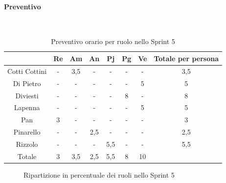 \documentclass{article}
\begin{document}
                \paragraph{Preventivo}\mbox{}\\
                \begin{table}[H]
                    \centering
                    \begin{tabular}{|c|c|c|c|c|c|c|c|}
                    \hline
                                  & Re  & Am  & An  & Pj  & Pg  & Ve  & Totale per persona \\ \hline
                    Cotti Cottini & -   & 3,5 & -   & -   & -   & -   & 3,5                \\ \hline
                    Di Pietro     & -   & -   & -   & -   & -   & 5   & 5                  \\ \hline
                    Diviesti      & -   & -   & -   & -   & 8  & -   & 8                 \\ \hline
                    Lapenna       & -   & -   & -   & -   & -   & 5   & 5                  \\ \hline
                    Pan           & 3   & -   & -   & -   & -   & -   & 3                  \\ \hline
                    Pinarello     & -   & -   & 2,5 & -   & -   & -   & 2,5                \\ \hline
                    Rizzolo       & -   & -   & -   & 5,5 & -   & -   & 5,5                \\ \hline
                    Totale        & 3   & 3,5 & 2,5 & 5,5 & 8  & 10  &                    \\ \hline
                    \end{tabular}
                    \caption{Preventivo orario per ruolo nello Sprint 5}
                \end{table}


                \begin{figure}[H]
                    \centering
                    \caption{Ripartizione in percentuale dei ruoli nello Sprint 5}
                \end{figure}


\end{document}
